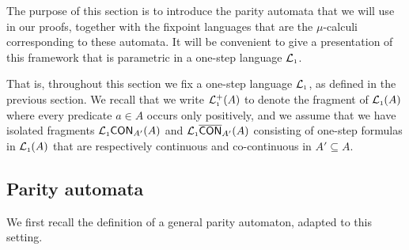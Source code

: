 

The purpose of this section is to introduce the parity automata that we will use
in our proofs, together with the fixpoint languages that are the $\mu$-calculi 
corresponding to these automata.
It will be convenient to give a presentation of this framework that is parametric
in a one-step language $\mathcal{L}_{\scriptscriptstyle 1}$.

That is, throughout this section we fix a one-step language $\mathcal{L}_{\scriptscriptstyle 1}$, as defined
in the previous section.
We recall that we write $\mathcal{L}_{\scriptscriptstyle 1}^+(A)$ to denote the fragment of $\mathcal{L}_{\scriptscriptstyle 1}(A)$ 
where every predicate $a\in A$ occurs only positively, and we assume that 
we have isolated fragments $\mathcal{L}_{\scriptscriptstyle 1}\mathsf{CON}_{A'}(A)$ and $\mathcal{L}_{\scriptscriptstyle 1}\overline{\mathsf{CON}}_{A'}(A)$
consisting of one-step formulas in $\mathcal{L}_{\scriptscriptstyle 1}(A)$ that are respectively continuous
and co-continuous in $A' \subseteq A$.

\subsection{Parity automata}

We first recall the definition of a general parity automaton, adapted to this
setting. 

